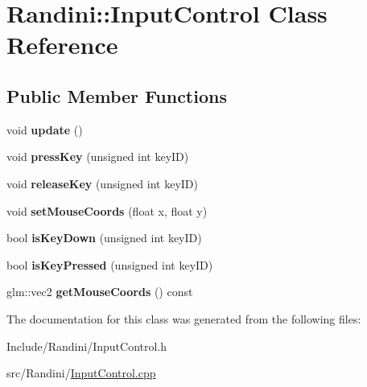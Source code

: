 \hypertarget{classRandini_1_1InputControl}{
\section{Randini::InputControl Class Reference}
\label{classRandini_1_1InputControl}
}
\subsection*{Public Member Functions}
\begin{DoxyCompactItemize}
\item 
\hypertarget{classRandini_1_1InputControl_a8b03756c114cefa983dce5a97b18138d}{
void {\bfseries update} ()}
\label{classRandini_1_1InputControl_a8b03756c114cefa983dce5a97b18138d}

\item 
\hypertarget{classRandini_1_1InputControl_a1b1b8d717a70da6874a047d6a83f90df}{
void {\bfseries pressKey} (unsigned int keyID)}
\label{classRandini_1_1InputControl_a1b1b8d717a70da6874a047d6a83f90df}

\item 
\hypertarget{classRandini_1_1InputControl_a64352005e174fb38a18cdee3874a3f2b}{
void {\bfseries releaseKey} (unsigned int keyID)}
\label{classRandini_1_1InputControl_a64352005e174fb38a18cdee3874a3f2b}

\item 
\hypertarget{classRandini_1_1InputControl_a7d59848ed252cba960ed66528460e4e3}{
void {\bfseries setMouseCoords} (float x, float y)}
\label{classRandini_1_1InputControl_a7d59848ed252cba960ed66528460e4e3}

\item 
\hypertarget{classRandini_1_1InputControl_a7afd081b388ab767e5f453af0f944af8}{
bool {\bfseries isKeyDown} (unsigned int keyID)}
\label{classRandini_1_1InputControl_a7afd081b388ab767e5f453af0f944af8}

\item 
\hypertarget{classRandini_1_1InputControl_a1cfe9f5f3d3e551add411776af91ce6f}{
bool {\bfseries isKeyPressed} (unsigned int keyID)}
\label{classRandini_1_1InputControl_a1cfe9f5f3d3e551add411776af91ce6f}

\item 
\hypertarget{classRandini_1_1InputControl_a0af97c3a0dd5b89cf344867279695a59}{
glm::vec2 {\bfseries getMouseCoords} () const }
\label{classRandini_1_1InputControl_a0af97c3a0dd5b89cf344867279695a59}

\end{DoxyCompactItemize}


The documentation for this class was generated from the following files:\begin{DoxyCompactItemize}
\item 
Include/Randini/InputControl.h\item 
src/Randini/\hyperlink{InputControl_8cpp}{InputControl.cpp}\end{DoxyCompactItemize}
